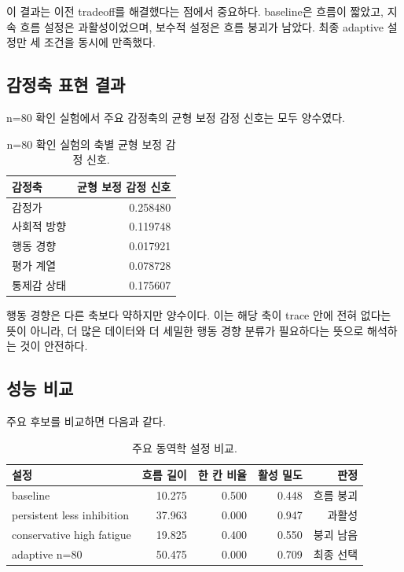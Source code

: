 \documentclass[11pt,a4paper]{article}
\begin{document}
이 결과는 이전 tradeoff를 해결했다는 점에서 중요하다. baseline은 흐름이 짧았고, 지속 흐름 설정은 과활성이었으며, 보수적 설정은 흐름 붕괴가 남았다. 최종 adaptive 설정만 세 조건을 동시에 만족했다.

\subsection{감정축 표현 결과}

n=80 확인 실험에서 주요 감정축의 균형 보정 감정 신호는 모두 양수였다.

\begin{table}[h]
\centering
\small
\begin{tabular}{lr}
\toprule
감정축 & 균형 보정 감정 신호 \\
\midrule
감정가 & 0.258480 \\
사회적 방향 & 0.119748 \\
행동 경향 & 0.017921 \\
평가 계열 & 0.078728 \\
통제감 상태 & 0.175607 \\
\bottomrule
\end{tabular}
\caption{n=80 확인 실험의 축별 균형 보정 감정 신호.}
\label{tab:balanced-lift}
\end{table}

행동 경향은 다른 축보다 약하지만 양수이다. 이는 해당 축이 trace 안에 전혀 없다는 뜻이 아니라, 더 많은 데이터와 더 세밀한 행동 경향 분류가 필요하다는 뜻으로 해석하는 것이 안전하다.

\subsection{성능 비교}

주요 후보를 비교하면 다음과 같다.

\begin{table}[h]
\centering
\small
\begin{tabular}{lrrrr}
\toprule
설정 & 흐름 길이 & 한 칸 비율 & 활성 밀도 & 판정 \\
\midrule
baseline & 10.275 & 0.500 & 0.448 & 흐름 붕괴 \\
persistent less inhibition & 37.963 & 0.000 & 0.947 & 과활성 \\
conservative high fatigue & 19.825 & 0.400 & 0.550 & 붕괴 남음 \\
adaptive n=80 & 50.475 & 0.000 & 0.709 & 최종 선택 \\
\bottomrule
\end{tabular}
\caption{주요 동역학 설정 비교.}
\label{tab:dynamics-comparison}
\end{table}
\end{document}
